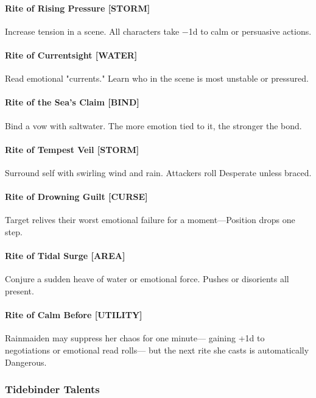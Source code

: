 \documentclass[11pt]{book}
\begin{document}
\paragraph{Rite of Rising Pressure [STORM]}
Increase tension in a scene. All characters take −1d to calm or persuasive actions.

\paragraph{Rite of Currentsight [WATER]}
Read emotional "currents." Learn who in the scene is most unstable or pressured.

\paragraph{Rite of the Sea's Claim [BIND]}
Bind a vow with saltwater. The more emotion tied to it, the stronger the bond.

\paragraph{Rite of Tempest Veil [STORM]}
Surround self with swirling wind and rain. Attackers roll Desperate unless braced.

\paragraph{Rite of Drowning Guilt [CURSE]}
Target relives their worst emotional failure for a moment---Position drops one step.

\paragraph{Rite of Tidal Surge [AREA]}
Conjure a sudden heave of water or emotional force. Pushes or disorients all present.

\paragraph{Rite of Calm Before [UTILITY]}
Rainmaiden may suppress her chaos for one minute---  
gaining +1d to negotiations or emotional read rolls---  
but the next rite she casts is automatically Dangerous.

\subsubsection*{Tidebinder Talents}
\end{document}
